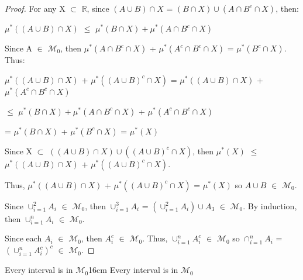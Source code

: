     \begin{proof}
        For any X $\subset$ $\mathbb{R}$,
        since $(A \cup B) \cap X$ = $(B \cap X) \cup (A \cap B^c \cap X)$, then:

        \hspace{0.5cm}
        $\mu^*((A \cup B) \cap X)$
        $\leq$ $\mu^*(B \cap X) + \mu^*(A \cap B^c \cap X)$

        Since A $\in$ $\mathcal{M}_0$, then
        $\mu^*(A \cap B^c \cap X)$ + $\mu^*(A^c \cap B^c \cap X)$
        = $\mu^*(B^c \cap X)$. Thus:

        \hspace{0.5cm}
        $\mu^*((A \cup B) \cap X)$ + $\mu^*((A \cup B)^c \cap X)$
        = $\mu^*((A \cup B) \cap X)$ + $\mu^*(A^c \cap B^c \cap X)$

        \hspace{7.4cm}
        $\leq$ $\mu^*(B \cap X) + \mu^*(A \cap B^c \cap X)$
                + $\mu^*(A^c \cap B^c \cap X)$

        \hspace{7.4cm}
        = $\mu^*(B \cap X)$ + $\mu^*(B^c \cap X)$
        = $\mu^*(X)$

        Since X $\subset$ $((A \cup B) \cap X) \cup ((A \cup B)^c \cap X)$, then
        $\mu^*(X)$
        $\leq$ $\mu^*((A \cup B) \cap X)$ + $\mu^*((A \cup B)^c \cap X)$.

        Thus, $\mu^*((A \cup B) \cap X)$ + $\mu^*((A \cup B)^c \cap X)$
        = $\mu^*(X)$ so $A \cup B$ $\in$ $\mathcal{M}_0$.

        Since $\cup_{i=1}^2 A_i$ $\in$ $\mathcal{M}_0$, then $\cup_{i=1}^3 A_i$
        = $(\cup_{i=1}^2 A_i) \cup A_3$ $\in$ $\mathcal{M}_0$. By induction, then
        $\cup_{i=1}^n A_i$ $\in$ $\mathcal{M}_0$.

        Since each $A_i$ $\in$ $\mathcal{M}_0$, then
        $A_i^c$ $\in$ $\mathcal{M}_0$.
        Thus, $\cup_{i=1}^n A_i^c$ $\in$ $\mathcal{M}_0$ so
        $\cap_{i=1}^n A_i$ = $(\cup_{i=1}^n A_i^c)^c$ $\in$ $\mathcal{M}_0$.
    \end{proof}

    \newpage



    \begin{wtheorem}{Every interval is in $\mathcal{M}_0$}{16cm}
        Every interval is in $\mathcal{M}_0$
    \end{wtheorem}


